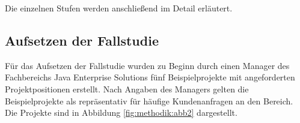 Die einzelnen Stufen werden anschließend im Detail erläutert.

\subsection{Aufsetzen der Fallstudie}
Für das Aufsetzen der Fallstudie wurden zu Beginn durch einen Manager des Fachbereichs Java Enterprise Solutions fünf Beispielprojekte mit angeforderten Projektpositionen erstellt.
Nach Angaben des Managers gelten die Beispielprojekte als repräsentativ für häufige Kundenanfragen an den Bereich.
Die Projekte sind in Abbildung \ref{fig:methodik:abb2} dargestellt.



